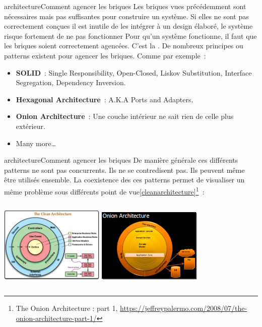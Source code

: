 \documentclass{beamer}
\begin{document}
    \begin{frame}{ architecture}{Comment agencer les briques}
        Les briques vues précédemment sont nécessaires mais pas suffisantes pour construire un système.
        Si elles ne sont pas correctement conçues il est inutile de les intégrer à un design élaboré, le système risque fortement de ne pas fonctionner
        \bigbreak
        Pour qu'un système fonctionne, il faut que les briques soient correctement agencées.
        C'est la .
        \bigbreak
        De nombreux principes ou patterns existent pour agencer les briques.
        Comme par exemple~:
        \begin{itemize}
            \item \textbf{SOLID}~: Single Responsibility, Open-Closed, Liskov Substitution, Interface Segregation, Dependency Inversion.
            \item \textbf{Hexagonal Architecture}~: A.K.A Ports and Adapters.
            \item \textbf{Onion Architecture}~: Une couche intérieur ne sait rien de celle plus extérieur.
            \item Many more\ldots
        \end{itemize}
    \end{frame}

    \begin{frame}{ architecture}{Comment agencer les briques}
        De manière générale ces différents patterns ne sont pas concurrents.
        Ils ne se contredisent pas.
        Ils peuvent même être utilisés ensemble.
        \bigbreak
        La coexistence des ces patterns permet de visualiser un même problème sous différents point de vue\cref{cleanarchitecture}\footnotestep\footnote{The Onion Architecture : part 1, \url{https://jeffreypalermo.com/2008/07/the-onion-architecture-part-1/}}~:
        \begin{columns}
            \centering
            \includegraphics[width=5cm]{image/the-clean-architecture}
            \centering
            \includegraphics[width=5cm]{image/onion-architecture}
        \end{columns}
    \end{frame}
\end{document}
